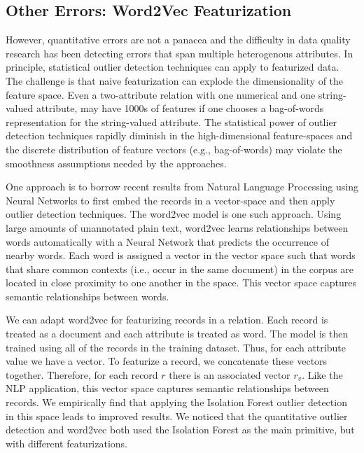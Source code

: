 \subsection{Other Errors: Word2Vec Featurization}
However, quantitative errors are not a panacea and the difficulty in data quality research has been detecting errors that span multiple heterogenous attributes.
In principle, statistical outlier detection techniques can apply to featurized data.
The challenge is that naive featurization can explode the dimensionality of the feature space. Even a two-attribute relation with one numerical and one string-valued attribute, may have 1000s of features if one chooses a bag-of-words representation for the string-valued attribute.
The statistical power of outlier detection techniques rapidly diminish in the high-dimensional feature-spaces and the discrete distribution of feature vectors (e.g., bag-of-words) may violate the smoothness assumptions needed by the approaches.

One approach is to borrow recent results from Natural Language Processing using Neural Networks to first embed the records in a vector-space and then apply outlier detection techniques. The \textsf{word2vec} model \cite{mikolov2013distributed} is one such approach.
Using large amounts of unannotated plain text, \textsf{word2vec} learns relationships between words automatically with a Neural Network that predicts the occurrence of nearby words.
 Each word is assigned a vector in the vector space such that words that share common contexts (i.e., occur in the same document) in the corpus are located in close proximity to one another in the space.
 This vector space captures semantic relationships between words.
 
 We can adapt \textsf{word2vec} for featurizing records in a relation. Each record is treated as a document and each attribute is treated as word.
 The model is then trained using all of the records in the training dataset.
 Thus, for each attribute value we have a vector.
 To featurize a record, we concatenate these vectors together.
 Therefore, for each record $r$ there is an associated vector $r_v$.
  Like the NLP application, this vector space captures semantic relationships between records.
  We empirically find that applying the Isolation Forest outlier detection in this space leads to improved results.
We noticed that the quantitative outlier detection and word2vec both used the Isolation Forest as the main primitive, but with different featurizations.





